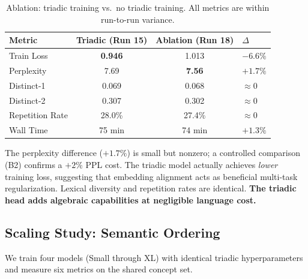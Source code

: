\documentclass[11pt,a4paper]{article}
\begin{document}
\begin{table}[h]
\centering
\caption{Ablation: triadic training vs.\ no triadic training. All metrics are within run-to-run variance.}
\label{tab:ablation}
\begin{tabular}{lccl}
\toprule
Metric & Triadic (Run 15) & Ablation (Run 18) & $\Delta$ \\
\midrule
Train Loss       & \textbf{0.946} & 1.013 & $-6.6\%$ \\
Perplexity       & 7.69  & \textbf{7.56} & $+1.7\%$ \\
Distinct-1       & 0.069 & 0.068 & $\approx 0$ \\
Distinct-2       & 0.307 & 0.302 & $\approx 0$ \\
Repetition Rate  & 28.0\% & 27.4\% & $\approx 0$ \\
Wall Time        & 75 min & 74 min & $+1.3\%$ \\
\bottomrule
\end{tabular}
\end{table}

The perplexity difference ($+1.7\%$) is small but nonzero; a controlled comparison (B2) confirms a $+2\%$ PPL cost. The triadic model actually achieves \emph{lower} training loss, suggesting that embedding alignment acts as beneficial multi-task regularization. Lexical diversity and repetition rates are identical. \textbf{The triadic head adds algebraic capabilities at negligible language cost.}


\subsection{Scaling Study: Semantic Ordering}
\label{sec:scaling}

We train four models (Small through XL) with identical triadic hyperparameters and measure six metrics on the shared concept set.
\end{document}
